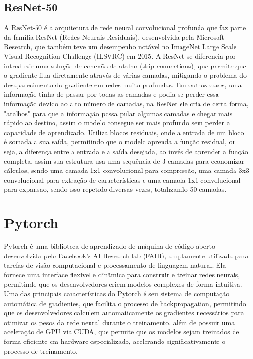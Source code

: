 \subsection{ResNet-50}
A ResNet-50 é a arquitetura de rede neural convolucional profunda que faz parte da família ResNet (Redes Neurais Residuais), desenvolvida pela Microsoft Research, que também teve um desempenho notável no ImageNet Large Scale Visual Recognition Challenge (ILSVRC) em 2015.
A ResNet se diferencia por introduzir uma solução de conexão de atalho (skip connections), que permite que o gradiente flua diretamente através de várias camadas, mitigando o problema do desaparecimento do gradiente em redes muito profundas. Em outros casos, uma informação tinha de passar por todas as camadas e podia se perder essa informação devido ao alto número de camadas, na ResNet ele cria de certa forma, "atalhos" para que a informação possa pular algumas camadas e chegar mais rápido ao destino, assim o modelo consegue ser mais profundo sem perder a capacidade de aprendizado.
Utiliza blocos residuais, onde a entrada de um bloco é somada a sua saída, permitindo que o modelo aprenda a função residual, ou seja, a diferença entre a entrada e a saída desejada, ao invés de aprender a função completa, assim sua estrutura usa uma sequência de 3 camadas para economizar cálculos, sendo uma camada 1x1 convolucional para compressão, uma camada 3x3 convolucional para extração de características e uma camada 1x1 convolucional para expansão, sendo isso repetido diversas vezes, totalizando 50 camadas.
\section{Pytorch}
Pytorch é uma biblioteca de aprendizado de máquina de código aberto desenvolvida pelo Facebook's AI Research lab (FAIR), amplamente utilizada para tarefas de visão computacional e processamento de linguagem natural.
Ela fornece uma interface flexível e dinâmica para construir e treinar redes neurais, permitindo que os desenvolvedores criem modelos complexos de forma intuitiva.
Uma das principais características do Pytorch é seu sistema de computação automática de gradientes, que facilita o processo de backpropagation, permitindo que os desenvolvedores calculem automaticamente os gradientes necessários para otimizar os pesos da rede neural durante o treinamento, além de possuir uma aceleração de GPU via CUDA, que permite que os modelos sejam treinados de forma eficiente em hardware especializado, acelerando significativamente o processo de treinamento.
